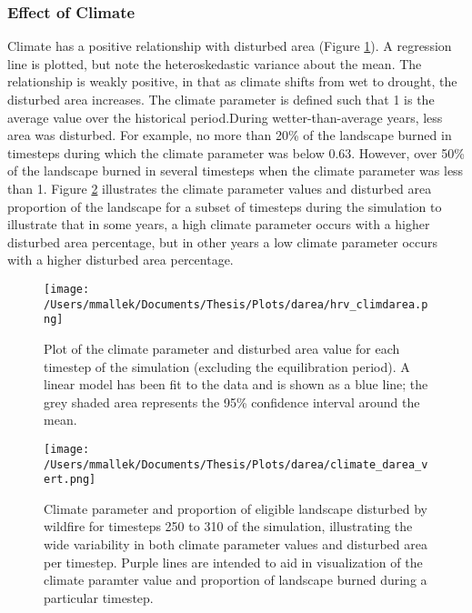 
\subsubsection{Effect of Climate} 
Climate has a positive relationship with disturbed area (Figure \ref{fig:climate_darea}). A regression line is plotted, but note the heteroskedastic variance about the mean. The relationship is weakly positive, in that as climate shifts from wet to drought, the disturbed area increases. The climate parameter is defined such that 1 is the average value over the historical period.During wetter-than-average years, less area was disturbed. For example, no more than 20\% of the landscape burned in timesteps during which the climate parameter was below 0.63. However, over 50\% of the landscape burned in several timesteps when the climate parameter was less than 1. Figure \ref{fig:compare_clim_darea} illustrates the climate parameter values and disturbed area proportion of the landscape for a subset of timesteps during the simulation to illustrate that in some years, a high climate parameter occurs with a higher disturbed area percentage, but in other years a low climate parameter occurs with a higher disturbed area percentage.

\begin{figure}[!htbp]
  \centering
    \texttt{[image: /Users/mmallek/Documents/Thesis/Plots/darea/hrv\_climdarea.png]}
  \caption{Plot of the climate parameter and disturbed area value for each timestep of the simulation (excluding the equilibration period). A linear model has been fit to the data and is shown as a blue line; the grey shaded area represents the 95\% confidence interval around the mean.}
  \label{fig:climate_darea}
\end{figure}


\begin{figure}[!htbp]
\centering
\texttt{[image: /Users/mmallek/Documents/Thesis/Plots/darea/climate\_darea\_vert.png]}
\caption{Climate parameter and proportion of eligible landscape disturbed by wildfire for timesteps 250 to 310 of the simulation, illustrating the wide variability in both climate parameter values and disturbed area per timestep. Purple lines are intended to aid in visualization of the climate paramter value and proportion of landscape burned during a particular timestep.}
\label{fig:compare_clim_darea}
\end{figure}

